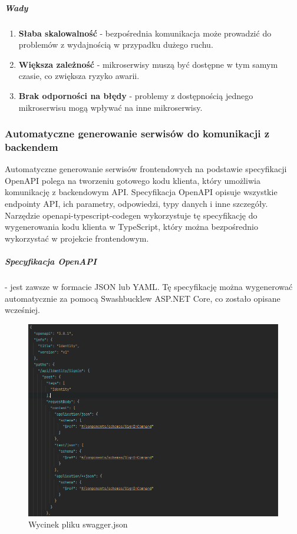 \subparagraph{Wady}

\begin{enumerate}
\item {\bf Słaba skalowalność} - bezpośrednia komunikacja może prowadzić do problemów z wydajnością w przypadku dużego ruchu.
\item {\bf Większa zależność} - mikroserwisy muszą być dostępne w tym samym czasie, co zwiększa ryzyko awarii.
\item {\bf Brak odporności na błędy} - problemy z dostępnością jednego mikroserwisu mogą wpływać na inne mikroserwisy.

\end{enumerate}

\subsubsection{Automatyczne generowanie serwisów do komunikacji z backendem}
Automatyczne generowanie serwisów frontendowych na podstawie specyfikacji OpenAPI polega na tworzeniu gotowego kodu klienta, który umożliwia komunikację z backendowym API. Specyfikacja OpenAPI opisuje wszystkie endpointy API, ich parametry, odpowiedzi, typy danych i inne szczegóły. Narzędzie openapi-typescript-codegen wykorzystuje tę specyfikację do wygenerowania kodu klienta w TypeScript, który można bezpośrednio wykorzystać w projekcie frontendowym.

\subparagraph{Specyfikacja OpenAPI} - jest zawsze w formacie JSON lub YAML. Tę specyfikację można wygenerować automatycznie za pomocą Swashbuckle\linebreak w ASP.NET Core, co zostało opisane wcześniej.

\begin{figure}[H]
    \centering
    \includegraphics[width=1\linewidth]{Obrazy/swaggerExample.png}
    \caption{Wycinek pliku swagger.json}
    \label{fig:enter-label}
\end{figure}

